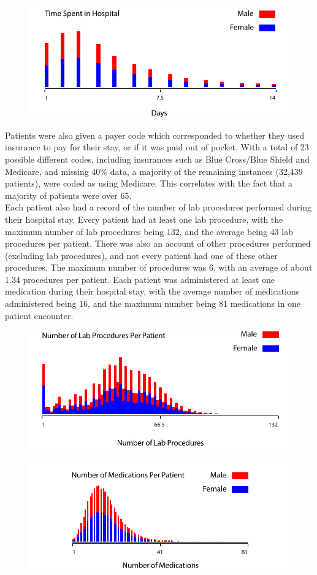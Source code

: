 \documentclass{neu_handout}
\begin{document}
\begin{figure}[h]
\centering
{
\includegraphics[width=0.47\linewidth]{Time_in_hospital.pdf}
}

\end{figure}

Patients were also given a payer code which corresponded to whether they used insurance to pay for their stay, or if it was paid out of pocket. With a total of 23 possible different codes, including insurances such as Blue Cross/Blue Shield and Medicare, and missing $ 40 \% $ data, a majority of the remaining instances (32,439 patients), were coded as using Medicare. This correlates with the fact that a majority of patients were over 65. \\

Each patient also had a record of the number of lab procedures performed during their hospital stay. Every patient had at least one lab procedure, with the maximum number of lab procedures being 132, and the average being 43 lab procedures per patient. There was also an account of other procedures performed (excluding lab procedures), and not every patient had one of these other procedures. The maximum number of procedures was 6, with an average of about 1.34 procedures per patient. Each patient was administered at least one medication during their hospital stay, with the average number of medications administered being 16, and the maximum number being 81 medications in one patient encounter.\\

\begin{figure}[H]
\centering
{
\includegraphics[width=0.47\linewidth]{Num_Lab_Procedures.pdf}
}

\end{figure}

\begin{figure}[H]
\centering
{
\includegraphics[width=0.47\linewidth]{Num_Medications.pdf}
}

\end{figure}
\end{document}
